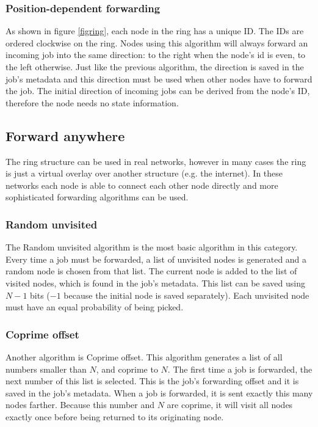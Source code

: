 \documentclass[10pt,a4paper]{article}
\begin{document}
\subsubsection*{Position-dependent forwarding}
As shown in figure \ref{figring}, each node in the ring has a unique ID. The IDs are ordered clockwise on the ring. Nodes using this algorithm will always forward an incoming job into the same direction: to the right when the node's id is even, to the left otherwise. Just like the previous algorithm, the direction is saved in the job's metadata and this direction must be used when other nodes have to forward the job. The initial direction of incoming jobs can be derived from the node's ID, therefore the node needs no state information.

\subsection{Forward anywhere}
The ring structure can be used in real networks, however in many cases the ring is just a virtual overlay over another structure (e.g. the internet). In these networks each node is able to connect each other node directly and more sophisticated forwarding algorithms can be used.

\subsubsection*{Random unvisited}
The Random unvisited algorithm is the most basic algorithm in this category. Every time a job must be forwarded, a list of unvisited nodes is generated and a random node is chosen from that list. The current node is added to the list of visited nodes, which is found in the job's metadata. This list can be saved using $N-1$ bits ($-1$ because the initial node is saved separately). Each unvisited node must have an equal probability of being picked.

\subsubsection*{Coprime offset}
Another algorithm is Coprime offset. This algorithm generates a list of all numbers smaller than $N$, and coprime to $N$. The first time a job is forwarded, the next number of this list is selected. This is the job's forwarding offset and it is saved in the job's metadata. When a job is forwarded, it is sent exactly this many nodes farther. Because this number and $N$ are coprime, it will visit all nodes exactly once before being returned to its originating node. 
\end{document}
